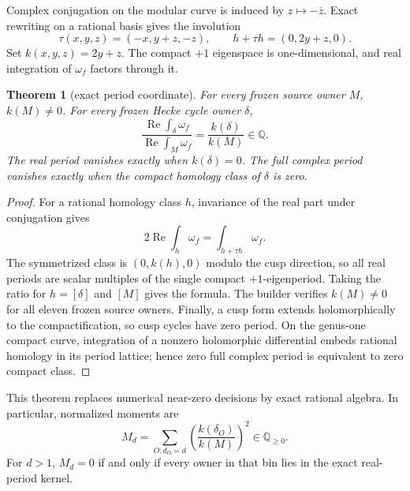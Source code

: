 \documentclass[11pt]{article}
\newtheorem{theorem}{Theorem}[section]
\theoremstyle{definition}
\theoremstyle{remark}
\newcommand{\QQ}{\mathbb Q}
\begin{document}
Complex conjugation on the modular curve is induced by $z\mapsto-\overline z$. Exact rewriting on a rational basis gives the involution
\[
\tau(x,y,z)=(-x,y+z,-z),
\qquad
h+\tau h=(0,2y+z,0).
\]
Set $k(x,y,z)=2y+z$. The compact $+1$ eigenspace is one-dimensional, and real integration of $\omega_f$ factors through it.

\begin{theorem}[exact period coordinate]\label{thm:k}
For every frozen source owner $M$, $k(M)\neq0$. For every frozen Hecke cycle owner $\delta$,
\[
\frac{\operatorname{Re}\int_\delta\omega_f}
{\operatorname{Re}\int_M\omega_f}
=\frac{k(\delta)}{k(M)}\in\QQ.
\]
The real period vanishes exactly when $k(\delta)=0$. The full complex period vanishes exactly when the compact homology class of $\delta$ is zero.
\end{theorem}

\begin{proof}
For a rational homology class $h$, invariance of the real part under conjugation gives
\[
2\operatorname{Re}\int_h\omega_f=\int_{h+\tau h}\omega_f.
\]
The symmetrized class is $(0,k(h),0)$ modulo the cusp direction, so all real periods are scalar multiples of the single compact $+1$-eigenperiod. Taking the ratio for $h=[\delta]$ and $[M]$ gives the formula. The builder verifies $k(M)\neq0$ for all eleven frozen source owners. Finally, a cusp form extends holomorphically to the compactification, so cusp cycles have zero period. On the genus-one compact curve, integration of a nonzero holomorphic differential embeds rational homology in its period lattice; hence zero full complex period is equivalent to zero compact class.
\end{proof}

This theorem replaces numerical near-zero decisions by exact rational algebra. In particular, normalized moments are
\[
M_d=\sum_{O:d_O=d}\left(\frac{k(\delta_O)}{k(M)}\right)^2\in\QQ_{\geq0}.
\]
For $d>1$, $M_d=0$ if and only if every owner in that bin lies in the exact real-period kernel.
\end{document}
